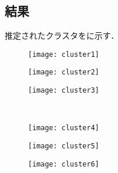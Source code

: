 \subsection{結果}
推定されたクラスタをに示す．

\begin{figure}[htbp]
    \begin{minipage}{0.32\hsize}
			\begin{center}
					\texttt{[image: cluster1]}
			\end{center}
		\end{minipage}
    \begin{minipage}{0.32\hsize}
			\begin{center}
					\texttt{[image: cluster2]}
			\end{center}
		\end{minipage}
    \begin{minipage}{0.32\hsize}
			\begin{center}
					\texttt{[image: cluster3]}
			\end{center}
		\end{minipage}\\
    \begin{minipage}{0.32\hsize}
			\begin{center}
					\texttt{[image: cluster4]}
			\end{center}
		\end{minipage}
    \begin{minipage}{0.32\hsize}
			\begin{center}
					\texttt{[image: cluster5]}
			\end{center}
		\end{minipage}
    \begin{minipage}{0.32\hsize}
			\begin{center}
					\texttt{[image: cluster6]}
			\end{center}
		\end{minipage}
		\label{fig:real-clst}
\end{figure}
